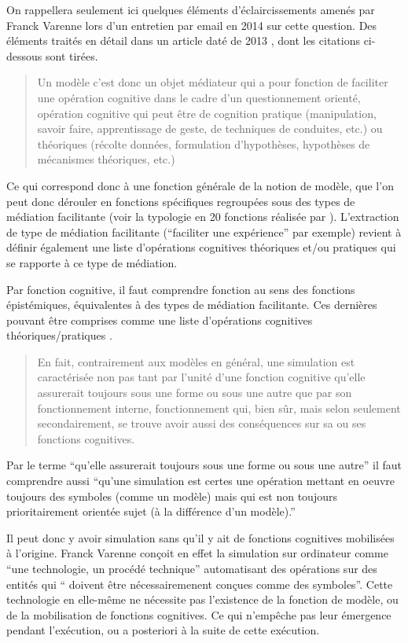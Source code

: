 On rappellera seulement ici quelques éléments d'éclaircissements amenés par Franck Varenne lors d'un entretien par email en 2014 sur cette question. Des éléments traités en détail dans un article daté de 2013 \autocite{Varenne2013b}, dont les citations ci-dessous sont tirées.

\blockquote[\cite{Varenne2013b}]{Un modèle c'est donc un objet médiateur qui a pour fonction de faciliter une opération cognitive dans le cadre d'un questionnement orienté, opération cognitive qui peut être de cognition pratique (manipulation, savoir­ faire, apprentissage de geste, de techniques de conduites, etc.) ou théoriques (récolte données, formulation d'hypothèses, hypothèses de mécanismes théoriques, etc.)}

Ce qui correspond donc à une fonction générale de la notion de modèle, que l'on peut donc dérouler en fonctions spécifiques regroupées sous des types de médiation facilitante (voir la typologie en 20 fonctions réalisée par \textcite{Varenne2013b}). L'extraction de type de médiation facilitante (\enquote{faciliter une expérience} par exemple) revient à définir également une liste d'opérations cognitives théoriques et/ou pratiques qui se rapporte à ce type de médiation.

Par fonction cognitive, il faut comprendre fonction au sens des fonctions épistémiques, équivalentes à des types de médiation facilitante. Ces dernières pouvant être comprises comme une liste d'opérations cognitives théoriques/pratiques .

\blockquote[\cite{Varenne2013b}]{En fait, contrairement aux modèles en général, une simulation est caractérisée non pas tant par l'unité d'une fonction cognitive qu'elle assurerait toujours sous une forme ou sous une autre que par son fonctionnement interne, fonctionnement qui, bien sûr, mais selon seulement secondairement, se trouve avoir aussi des conséquences sur sa ou ses fonctions cognitives.}

Par le terme \enquote{qu'elle assurerait toujours sous une forme ou sous une autre} il faut comprendre aussi \enquote{qu'une simulation est certes une opération mettant en oeuvre toujours des symboles (comme un modèle) mais qui est non toujours prioritairement orientée sujet (à la différence d'un modèle).}

Il peut donc y avoir simulation sans qu'il y ait de fonctions cognitives mobilisées à l'origine. Franck Varenne conçoit en effet la simulation sur ordinateur comme \enquote{une technologie, un procédé technique} automatisant des opérations sur des entités qui \enquote{ doivent être nécessairemenent conçues comme des symboles}. Cette technologie en elle-même ne nécessite pas l'existence de la fonction de modèle, ou de la mobilisation de fonctions cognitives. Ce qui n'empêche pas leur émergence pendant l'exécution, ou a posteriori à la suite de cette exécution.

